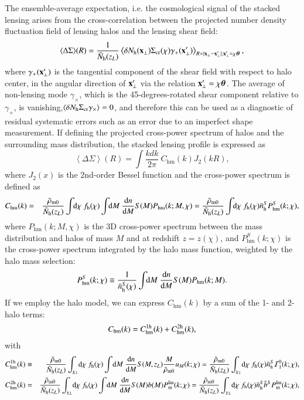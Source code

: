 \documentclass[onecolumn,notitlepage,showpacs,amsmath,amssymb,prd,floatfix]{revtex4-1}
\def\ave#1{\left\langle #1 \right\rangle}
\newcommand{\bx}{{\bf x}}
\newcommand{\btheta}{{\bm{\theta}}}
\newcommand{\dr}{\mathrm{d}}
\newcommand{\phm}{P_{\mathrm{hm}}}
\newcommand{\chm}{C_{\mathrm{hm}}}
\newcommand{\bh}{\mathrm{h}}
\newcommand{\bnh}{\frac{\dr n}{\dr M}}
\newcommand{\bnhs}{\bar{n}_{\rm h}^S}
\newcommand{\pml}{P^{\rm lin}_{\rm m}}
\newcommand{\sigmacr}{\Sigma_{\rm cr}}
\newcommand{\bNh}{\bar{N}_{\rm h}}
\newcommand{\dsigma}{\Delta\Sigma}
\begin{document}
The ensemble-average expectation, i.e. the cosmological signal of the
stacked lensing arises from the cross-correlation between the projected
number density fluctuation field of lensing halos and the lensing shear
field:
%
\begin{equation}
{\ave{\dsigma}}(R)=\frac{1}{\bNh(z_L)}
  \ave{\delta N_{\rm h}(\bx_\perp)\sigmacr(\chi)
  \gamma_{+}(\bx'_\perp)}_{R=|\bx_\perp-\bx'_\perp|;\bx'_\perp=\chi\btheta},
  \label{eq:e_dsigma}
\end{equation}
%
where $\gamma_+(\bx_\perp^{\prime})$ is the tangential component of the
shear field with respect to halo center, in the angular direction of
$\bx_\perp^{\prime}$ via the relation $\bx_\perp^{\prime}=\chi\btheta$.
The average of non-lensing mode $\gamma_\times$, which is the
45-degrees-rotated shear component relative to $\gamma_+$, is
vanishing,$\ave{\delta N_{\rm h}\sigmacr \gamma_\times}=0$, and
therefore this can be used as a diagnostic of residual systematic errors
such as an error due to an imperfect shape measurement. If defining the
projected cross-power spectrum of halos and the surrounding mass
distribution, the stacked lensing profile is expressed as
%
\begin{equation}
 \ave{\dsigma}(R)=\int\!\!\frac{kdk}{2\pi}~\chm(k)J_2(kR),
\end{equation}
%
where $J_2(x)$ is the 2nd-order Bessel function and the cross-power
spectrum is defined as
%
\begin{eqnarray}
 \chm(k)&=&\frac{\bar{\rho}_{\rm m0}}{\bNh(z_L)}\int\!\!\dr\chi~f_{\rm
  h}(\chi)\int\!\!\dr M~\bnh S(M)P_{\rm hm}(k;M,\chi)
  =\frac{\bar{\rho}_{\rm m0}}{\bNh(z_L)}\int\!\!\dr\chi~f_{\rm
  h}(\chi)\bnhs\phm^S(k;\chi),
  \label{eq:chm}
\end{eqnarray}
%
where $\phm(k;M,\chi)$ is the 3D cross-power spectrum between the mass
distribution and halos of mass $M$ and at redshift $z=z(\chi)$,
and $\phm^S(k;\chi)$ is the cross-power spectrum integrated by the halo
mass function, weighted by the halo mass selection:
%
\begin{equation}
 \phm^S(k;\chi)\equiv \frac{1}{\bnhs(\chi)}\int\!\!\dr M~\bnh S(M)\phm(k;M).
\label{eq:phmS}
\end{equation}
%
If we employ the halo model, we can express $\chm(k)$ by a sum
of the 1- and 2-halo terms:
%
\begin{equation}
 \chm(k)=\chm^{\rm 1h}(k)+\chm^{\rm 2h}(k),
\end{equation}
%
with
%
\begin{eqnarray}
\chm^{\rm 1h}(k)&\equiv &
  \frac{\bar{\rho}_{\rm m0}}{\bNh(z_L)}\int_{\chi_L}\!\dr\chi ~f_\bh(\chi)
  \int\!\dr M~\bnh S(M,z_L)\frac{M}{\bar{\rho}_{\rm m0}}u_M(k;\chi)
  =\frac{\bar{\rho}_{\rm m0}}{\bNh(z_L)}\int_{\chi_L}\!\dr\chi
  ~f_\bh(\chi)\bnhs{\cal I}^{0}_1(k;\chi),\nonumber\\
 \chm^{\rm 2h}(k)&=&
 \frac{\bar{\rho}_{\rm m0}}{\bNh(z_L)}\int_{\chi_L}\!\dr\chi ~f_\bh(\chi)
  \int\!\dr M~\bnh S(M)b(M)\pml(k;\chi)
=\frac{\bar{\rho}_{\rm m0}}{\bNh(z_L)}\int_{\chi_L}\!\dr\chi
~f_\bh(\chi) \bnhs \bar{b}^S
\pml(k;\chi),
\end{eqnarray}
\end{document}
